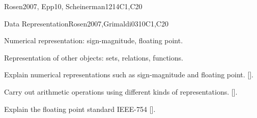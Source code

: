 \begin{syllabus}
\begin{unit}{\DSProofTechniques}{}{Rosen2007, Epp10, Scheinerman12}{14}{C1,C20}
\begin{learningoutcomes}
    \item \DSProofTechniquesLOIdentifyTheUsed [\Assessment]
    \item \DSProofTechniquesLOOutline [\Usage ]
    \item \DSProofTechniquesLOApplyEach [\Usage ]
    \item \DSProofTechniquesLODetermineWhich [\Assessment]
    \item \DSProofTechniquesLOExplainTheIdeas [\Familiarity ]
    \item \DSProofTechniquesLOExplainTheWeak [\Assessment]
    \item \DSProofTechniquesLOStateThe [\Familiarity]
\end{learningoutcomes}
\end{unit}

\begin{unit}{Data Representation}{}{Rosen2007,Grimaldi03}{10}{C1,C20}
    \begin{topics}
        \item Numerical representation: sign-magnitude, floating point.
        \item Representation of other objects: sets, relations, functions.
    \end{topics}

    \begin{learningoutcomes}
        \item Explain numerical representations such as sign-magnitude and floating point. [\Assessment].
        \item Carry out arithmetic operations using different kinds of representations. [\Assessment].
        \item Explain the floating point standard IEEE-754 [\Familiarity].   
    \end{learningoutcomes}
\end{unit}

\begin{coursebibliography}
\end{coursebibliography}

\end{syllabus}

%

